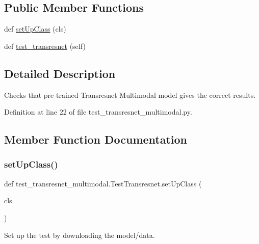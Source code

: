 \subsection*{Public Member Functions}
\begin{DoxyCompactItemize}
\item 
def \hyperlink{classtest__transresnet__multimodal_1_1TestTransresnet_ac013f711d027118f9d5db92c63659a80}{set\+Up\+Class} (cls)
\item 
def \hyperlink{classtest__transresnet__multimodal_1_1TestTransresnet_a812e5b711af8dfc4edd18dd4862928d5}{test\+\_\+transresnet} (self)
\end{DoxyCompactItemize}


\subsection{Detailed Description}
\begin{DoxyVerb}Checks that pre-trained Transresnet Multimodal model gives the correct results.\end{DoxyVerb}
 

Definition at line 22 of file test\+\_\+transresnet\+\_\+multimodal.\+py.



\subsection{Member Function Documentation}
\mbox{\label{classtest__transresnet__multimodal_1_1TestTransresnet_ac013f711d027118f9d5db92c63659a80}} 
\subsubsection{\texorpdfstring{set\+Up\+Class()}{setUpClass()}}
{\footnotesize\ttfamily def test\+\_\+transresnet\+\_\+multimodal.\+Test\+Transresnet.\+set\+Up\+Class (\begin{DoxyParamCaption}\item[{}]{cls }\end{DoxyParamCaption})}

\begin{DoxyVerb}Set up the test by downloading the model/data.\end{DoxyVerb}
 

